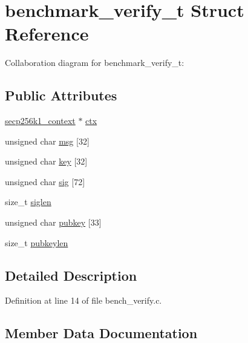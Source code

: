 \hypertarget{structbenchmark__verify__t}{}\section{benchmark\+\_\+verify\+\_\+t Struct Reference}
\label{structbenchmark__verify__t}


Collaboration diagram for benchmark\+\_\+verify\+\_\+t\+:
\subsection*{Public Attributes}
\begin{DoxyCompactItemize}
\item 
\hyperlink{secp256k1_8h_a282ec9e6dfec8c35955c3eb2f7476e5e}{secp256k1\+\_\+context} $\ast$ \hyperlink{structbenchmark__verify__t_ac4e3488929ce883255241ef451b8c9ad}{ctx}
\item 
unsigned char \hyperlink{structbenchmark__verify__t_a5941066c834af80d568078780c2d69d7}{msg} \mbox{[}32\mbox{]}
\item 
unsigned char \hyperlink{structbenchmark__verify__t_acdc2cf6f21a2aa51036585bd93fe11fc}{key} \mbox{[}32\mbox{]}
\item 
unsigned char \hyperlink{structbenchmark__verify__t_a3109a53e5491482e77df9039d3e01720}{sig} \mbox{[}72\mbox{]}
\item 
size\+\_\+t \hyperlink{structbenchmark__verify__t_a75e2235d538ab592d540c45118218843}{siglen}
\item 
unsigned char \hyperlink{structbenchmark__verify__t_af79770b187ad7a6dd6bc816682e02a8c}{pubkey} \mbox{[}33\mbox{]}
\item 
size\+\_\+t \hyperlink{structbenchmark__verify__t_a49a11cf3776db6f6df107d4632da6627}{pubkeylen}
\end{DoxyCompactItemize}


\subsection{Detailed Description}


Definition at line 14 of file bench\+\_\+verify.\+c.



\subsection{Member Data Documentation}
\hypertarget{structbenchmark__verify__t_ac4e3488929ce883255241ef451b8c9ad}{}
